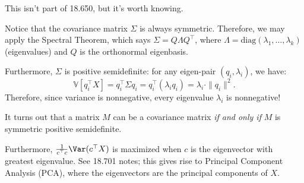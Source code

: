 \begin{remark}
    This isn't part of 18.650, but it's worth knowing.

    Notice that the covariance matrix $\Sigma$ is always symmetric.
    Therefore, we may apply the Spectral Theorem, which says $\Sigma = Q \Lambda Q^{\top}$, where
    $\Lambda = \mathrm{diag}(\lambda_1, \dots, \lambda_k)$ (eigenvalues) and $Q$ is the orthonormal eigenbasis.

    Furthermore, $\Sigma$ is positive semidefinite: for any eigen-pair $(q_i, \lambda_i)$, we have:
    \[ \mathbb{V}[q_i^{\top}X] = q_i^{\top} \Sigma q_i
    = q_i^{\top} (\lambda_i q_i) = \lambda_i \cdot \| q_i \|^2. \]
    Therefore, since variance is nonnegative, every eigenvalue $\lambda_i$ is nonnegative!

    It turns out that a matrix $M$ can be a covariance matrix
    \emph{if and only if} $M$ is symmetric positive semidefinite.

    Furthermore, $\frac{1}{c^{\top}c}\Var(c^{\top}X)$ is maximized when $c$ is the eigenvector
    with greatest eigenvalue.  See 18.701 notes; this gives rise to Principal Component
    Analysis (PCA), where the eigenvectors are the principal components of $X$.
\end{remark}

